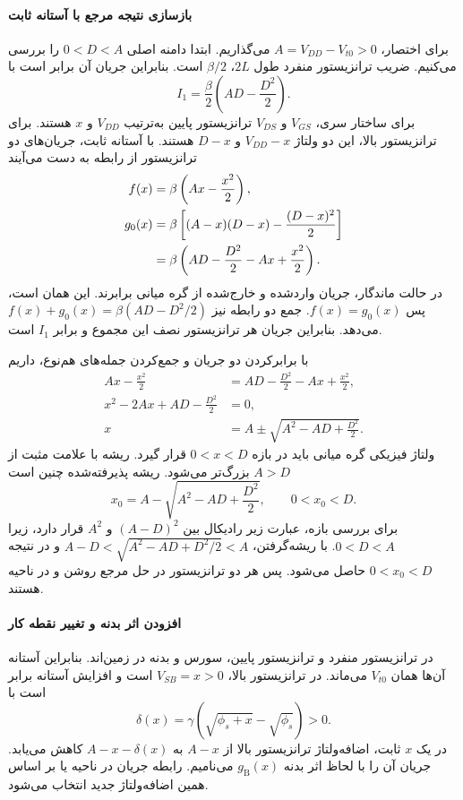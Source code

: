 \paragraph*{بازسازی نتیجه مرجع با آستانه ثابت}
برای اختصار، \(A=V_{DD}-V_{t0}>0\) می‌گذاریم. ابتدا دامنه اصلی
\(0<D<A\) را بررسی می‌کنیم. ضریب ترانزیستور منفرد طول \(2L\)،
\(\beta/2\) است. بنابراین جریان آن برابر است با
\begin{equation}
 I_1=\frac{\beta}{2}\left(AD-\frac{D^2}{2}\right).
 \label{eq:body-stack-single}
\end{equation}
برای ساختار سری، \(V_{GS}\) و \(V_{DS}\) ترانزیستور پایین به‌ترتیب
\(V_{DD}\) و \(x\) هستند. برای ترانزیستور بالا، این دو ولتاژ
\(V_{DD}-x\) و \(D-x\) هستند. با آستانه ثابت، جریان‌های دو ترانزیستور
از رابطه  به دست می‌آیند
\begin{align}
 f(x)&=\beta\left(Ax-\frac{x^2}{2}\right),\notag\\
 g_0(x)&=\beta\left[(A-x)(D-x)-\frac{(D-x)^2}{2}\right]\notag\\
 &=\beta\left(AD-\frac{D^2}{2}-Ax+\frac{x^2}{2}\right).
 \label{eq:body-stack-reference-currents}
\end{align}
در حالت ماندگار، جریان واردشده و خارج‌شده از گره میانی برابرند.
این همان  است، پس \(f(x)=g_0(x)\).
جمع دو رابطه نیز \(f(x)+g_0(x)=\beta(AD-D^2/2)\) می‌دهد. بنابراین
جریان هر ترانزیستور نصف این مجموع و برابر \(I_1\) است.

با برابرکردن دو جریان و جمع‌کردن جمله‌های هم‌نوع، داریم
\begin{align*}
 Ax-\frac{x^2}{2}&=AD-\frac{D^2}{2}-Ax+\frac{x^2}{2},\\
 x^2-2Ax+AD-\frac{D^2}{2}&=0,\\
 x&=A\pm\sqrt{A^2-AD+\frac{D^2}{2}}.
\end{align*}
ولتاژ فیزیکی گره میانی باید در بازه \(0<x<D\) قرار گیرد.
ریشه با علامت مثبت از \(A>D\) بزرگ‌تر می‌شود. ریشه پذیرفته‌شده چنین است
\begin{equation}
 x_0=A-\sqrt{A^2-AD+\frac{D^2}{2}},\qquad 0<x_0<D.
 \label{eq:body-stack-reference-root}
\end{equation}
برای بررسی بازه، عبارت زیر رادیکال بین \((A-D)^2\) و \(A^2\) قرار
دارد، زیرا \(0<D<A\). با ریشه‌گرفتن،
\(A-D<\sqrt{A^2-AD+D^2/2}<A\) و در نتیجه \(0<x_0<D\) حاصل می‌شود.
پس هر دو ترانزیستور در حل مرجع روشن و در ناحیه  هستند.

\paragraph*{افزودن اثر بدنه و تغییر نقطه کار}
در ترانزیستور منفرد و ترانزیستور پایین، سورس و بدنه در زمین‌اند.
بنابراین آستانه آن‌ها همان \(V_{t0}\) می‌ماند. در ترانزیستور بالا،
\(V_{SB}=x>0\) است و افزایش آستانه برابر است با
\begin{equation}
 \delta(x)=\gamma\left(\sqrt{\phi_s+x}-\sqrt{\phi_s}\right)>0.
 \label{eq:body-stack-shift}
\end{equation}
در یک \(x\) ثابت، اضافه‌ولتاژ ترانزیستور بالا از \(A-x\) به
\(A-x-\delta(x)\) کاهش می‌یابد. جریان آن را با لحاظ اثر بدنه
\(g_{\mathrm{B}}(x)\) می‌نامیم. رابطه جریان در ناحیه 
یا  بر اساس همین اضافه‌ولتاژ جدید انتخاب می‌شود.

